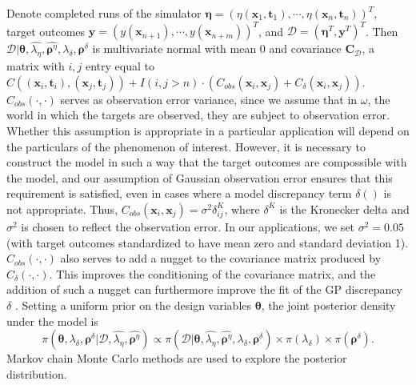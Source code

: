 \documentclass[12pt]{article}
\begin{document}
%
Denote completed runs of the simulator $\boldsymbol \eta = (\eta(\mathbf x_1,\mathbf t_1),\cdots,\eta(\mathbf x_n,\mathbf t_n))^T$, target outcomes $\mathbf y = (y(\mathbf x_{n+1}),\cdots,y(\mathbf x_{n+m}))^T$, 
and $\mathcal D = (\boldsymbol \eta^T,\mathbf y^T)^T$.
%
Then $\mathcal D | \boldsymbol \theta,\widehat{\lambda_\eta}, \widehat{\boldsymbol \rho^\eta},\lambda_\delta,\boldsymbol \rho^\delta$ is multivariate normal with mean 0 and covariance $\mathbf C_\mathcal D$, a matrix with $i,j$ entry equal to 
$
C((\mathbf x_i,\mathbf t_i),(\mathbf x_j,\mathbf t_j)) + I(i,j>n)\cdot(C_{obs}(\mathbf x_i,\mathbf x_j) + C_\delta(\mathbf x_i,\mathbf x_j)).
$
%
$C_{obs}(\cdot,\cdot)$ serves as observation error variance, since we assume that in $\omega$, the world in which the targets are observed, they are subject to observation error.
%
Whether this assumption is appropriate in a particular application will depend on the particulars of the phenomenon of interest.
%
However, it is necessary to construct the model in such a way that the target outcomes are compossible with the model, and our assumption of Gaussian observation error ensures that this requirement is satisfied, even in cases where a model discrepancy term $\delta()$ is not appropriate.
%
Thus, $C_{obs}(\mathbf x_i,\mathbf x_j) = \sigma^2\delta^K_{ij}$, where $\delta^K$ is the Kronecker delta and $\sigma^2$ is chosen to reflect the observation error.
%
%
In our applications, we set $\sigma^2=0.05$ (with target outcomes standardized to have mean zero and standard deviation 1).
%
$C_{obs}(\cdot,\cdot)$ also serves to add a nugget to the covariance matrix produced by $C_\delta(\cdot,\cdot)$.
%
This improves the conditioning of the covariance matrix, and the addition of such a nugget can furthermore improve the fit of the GP discrepancy $\delta$ \citep{Gramacy2012}.
%
Setting a uniform prior on the design variables $\boldsymbol\theta$, the joint posterior density under the model is
%
\begin{equation} \label{eq:full_dist}
\pi(\boldsymbol \theta,\lambda_\delta,\boldsymbol \rho^\delta|\mathcal D,\widehat{\lambda_\eta},\widehat{\boldsymbol \rho^\eta})
\propto \pi(\mathcal D | \boldsymbol \theta,\widehat{\lambda_\eta}, \widehat{\boldsymbol \rho^\eta},\lambda_\delta,\boldsymbol \rho^\delta) \times %
\pi(\lambda_\delta) \times \pi(\boldsymbol \rho^\delta).
\end{equation}
%
Markov chain Monte Carlo methods are used to explore the posterior distribution.
\end{document}
